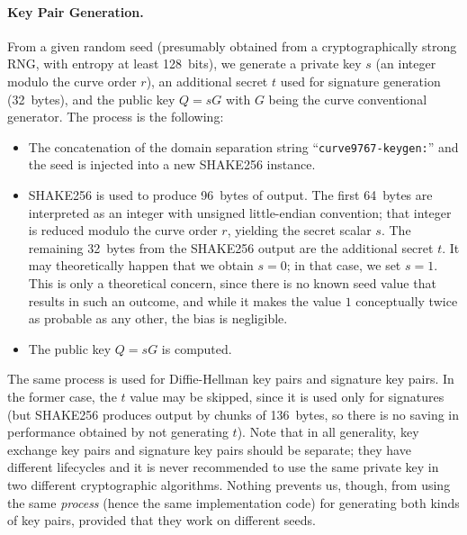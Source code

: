 \documentclass{llncs}
\begin{document}
\paragraph{Key Pair Generation.}

From a given random seed (presumably obtained from a cryptographically
strong RNG, with entropy at least 128~bits), we generate a private
key $s$ (an integer modulo the curve order $r$), an additional secret
$t$ used for signature generation (32~bytes), and the public key
$Q = sG$ with $G$ being the curve conventional generator. The process is
the following:
\begin{itemize}

    \item The concatenation of the domain separation string
    ``\verb+curve9767-keygen:+'' and the seed is injected into a new
    SHAKE256 instance.

    \item SHAKE256 is used to produce 96~bytes of output. The first
    64~bytes are interpreted as an integer with unsigned little-endian
    convention; that integer is reduced modulo the curve order $r$,
    yielding the secret scalar $s$. The remaining 32~bytes from the
    SHAKE256 output are the additional secret $t$. It may theoretically
    happen that we obtain $s = 0$; in that case, we set $s = 1$. This is
    only a theoretical concern, since there is no known seed value that
    results in such an outcome, and while it makes the value $1$
    conceptually twice as probable as any other, the bias is negligible.

    \item The public key $Q = sG$ is computed.

\end{itemize}

The same process is used for Diffie-Hellman key pairs and signature key
pairs. In the former case, the $t$ value may be skipped, since it is
used only for signatures (but SHAKE256 produces output by chunks of
136~bytes, so there is no saving in performance obtained by not
generating $t$). Note that in all generality, key exchange key pairs and
signature key pairs should be separate; they have different lifecycles
and it is never recommended to use the same private key in two different
cryptographic algorithms. Nothing prevents us, though, from using the
same \emph{process} (hence the same implementation code) for generating
both kinds of key pairs, provided that they work on different seeds.
\end{document}
